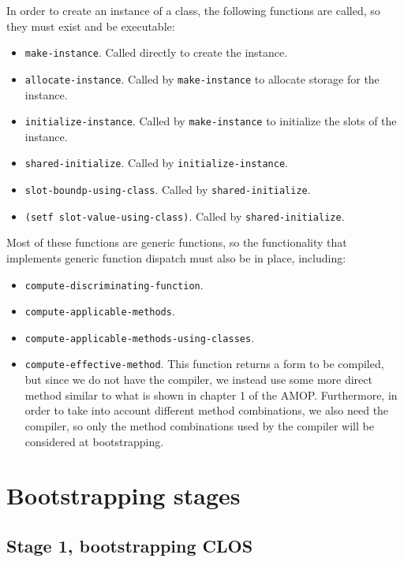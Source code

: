 In order to create an instance of a class, the following functions
are called, so they must exist and be executable:

\begin{itemize}
\item \texttt{make-instance}.  Called directly to create the instance.
\item \texttt{allocate-instance}.  Called by \texttt{make-instance} to
  allocate storage for the instance.
\item \texttt{initialize-instance}.  Called by \texttt{make-instance}
  to initialize the slots of the instance.
\item \texttt{shared-initialize}.  Called by
  \texttt{initialize-instance}.
\item \texttt{slot-boundp-using-class}.  Called by \texttt{shared-initialize}.
\item \texttt{(setf slot-value-using-class)}.  Called by
  \texttt{shared-initialize}.
\end{itemize}

Most of these functions are generic functions, so the functionality
that implements generic function dispatch must also be in place,
including:

\begin{itemize}
\item \texttt{compute-discriminating-function}.
\item \texttt{compute-applicable-methods}.
\item \texttt{compute-applicable-methods-using-classes}.
\item \texttt{compute-effective-method}.  This function returns a form
  to be compiled, but since we do not have the compiler, we instead
  use some more direct method similar to what is shown in chapter 1 of
  the AMOP.  Furthermore, in order to take into account different
  method combinations, we also need the compiler, so only the method
  combinations used by the compiler will be considered at
  bootstrapping.
\end{itemize}

\section{Bootstrapping stages}

\subsection{Stage 1, bootstrapping CLOS}

